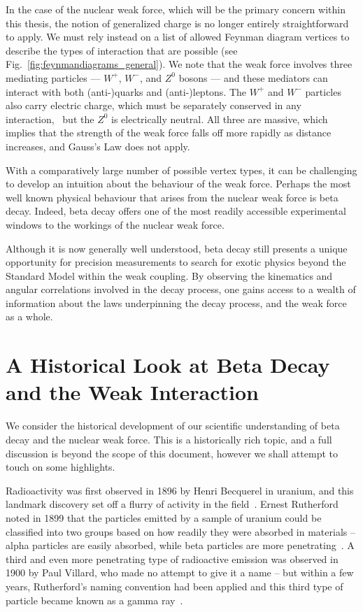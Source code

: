 In the case of the nuclear weak force, which will be the primary concern within this thesis, 
the notion of generalized charge is no longer entirely straightforward to apply.
We must rely instead on a list of allowed Feynman diagram vertices to describe the types of interaction that are possible (see Fig.~\ref{fig:feynmandiagrams_general}).  We note that the weak force involves three mediating particles --- $W^+$, $W^-$, and $Z^0$ bosons --- and these mediators can interact with both (anti-)quarks and (anti-)leptons.  The $W^+$ and $W^-$ particles also carry electric charge, which must be separately conserved in any interaction,~ but the $Z^0$ is electrically neutral.  All three are massive, which implies that the strength of the weak force falls off more rapidly as distance increases, and Gauss's Law does not apply. 


With a comparatively large number of possible vertex types, it can be challenging to develop an intuition about the behaviour of the weak force. 
Perhaps the most well known physical behaviour that arises from the nuclear weak force is beta decay. 
Indeed, beta decay
offers one of the most readily accessible experimental windows to the workings of the nuclear weak force.

Although it is now generally well understood, beta decay still presents a unique opportunity for precision measurements to search for exotic physics beyond the Standard Model within the weak coupling.
By observing the kinematics and angular correlations involved in the decay process, one gains access to a wealth of information about the 
laws underpinning the decay process, and the weak force as a whole.  



\section{A Historical Look at Beta Decay and the Weak Interaction}

We consider the historical development of our scientific understanding of beta decay and the nuclear weak force.  This is a historically rich topic, and a full discussion is beyond the scope of this document, however we shall attempt to touch on some highlights.

Radioactivity was first observed in 1896 by Henri Becquerel in uranium, and this landmark discovery set off a flurry of activity in the field~\cite{becquerel1896}.
Ernest Rutherford noted in 1899 that the particles emitted by a sample of uranium could be classified into two groups based on how readily they were absorbed in materials -- alpha particles are easily absorbed, while beta particles are more penetrating~\cite{rutherford1899}.  A third and even more penetrating type of radioactive emission was observed in 1900 by Paul Villard, who made no attempt to give it a name -- but within a few years, Rutherford's naming convention had been applied and this third type of particle became known as a gamma ray~\cite{villard1900}\cite{rutherford1903}.  

